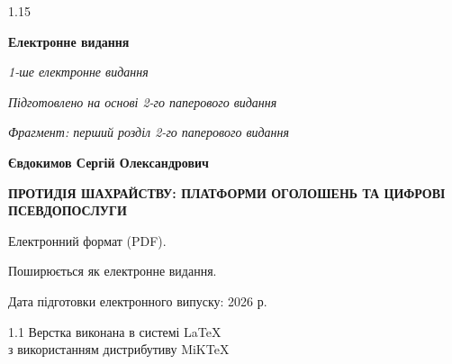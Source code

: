 ﻿\thispagestyle{empty}
\mbox{} 

\vspace*{\fill} %

\begin{center}
    \begin{spacing}{1.15} 
        \small 

        \textbf{Електронне видання} \par
        \vspace{2mm}
        \textit{1-ше електронне видання} \par
        \textit{Підготовлено на основі 2-го паперового видання} \par
        \textit{Фрагмент: перший розділ 2-го паперового видання} \par
        \vspace{6mm}
        
        {\large \textbf{Євдокимов Сергій Олександрович}} \par
        \vspace{3mm}
        
        {\large \textbf{ПРОТИДІЯ ШАХРАЙСТВУ: ПЛАТФОРМИ ОГОЛОШЕНЬ ТА ЦИФРОВІ ПСЕВДОПОСЛУГИ}} \par

        \vspace{8mm} 

        Електронний формат (PDF). \par
        Поширюється як електронне видання. \par

        \vspace{6mm} 

        Дата підготовки електронного випуску: 2026 р. \par
    \end{spacing}
\end{center}

\vfill %

\begin{center}
    \begin{spacing}{1.1}
        \scriptsize 
        Верстка виконана в системі \LaTeX \\
        з використанням дистрибутиву MiKTeX
    \end{spacing}
\end{center}

\vspace{1cm}